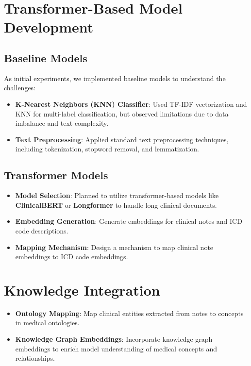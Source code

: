\documentclass[12pt,a4paper]{report}
\begin{document}
\section{Transformer-Based Model Development}

\subsection{Baseline Models}
As initial experiments, we implemented baseline models to understand the challenges:

\begin{itemize}
    \item \textbf{K-Nearest Neighbors (KNN) Classifier}: Used TF-IDF vectorization and KNN for multi-label classification, but observed limitations due to data imbalance and text complexity.
    \item \textbf{Text Preprocessing}: Applied standard text preprocessing techniques, including tokenization, stopword removal, and lemmatization.
\end{itemize}

\subsection{Transformer Models}
\begin{itemize}
    \item \textbf{Model Selection}: Planned to utilize transformer-based models like \textbf{ClinicalBERT} or \textbf{Longformer} to handle long clinical documents.
    \item \textbf{Embedding Generation}: Generate embeddings for clinical notes and ICD code descriptions.
    \item \textbf{Mapping Mechanism}: Design a mechanism to map clinical note embeddings to ICD code embeddings.
\end{itemize}

\section{Knowledge Integration}
\begin{itemize}
    \item \textbf{Ontology Mapping}: Map clinical entities extracted from notes to concepts in medical ontologies.
    \item \textbf{Knowledge Graph Embeddings}: Incorporate knowledge graph embeddings to enrich model understanding of medical concepts and relationships.
\end{itemize}
\end{document}
